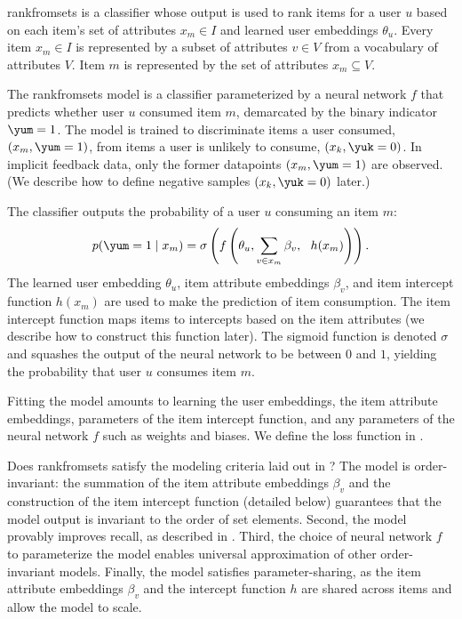 \acrshort{rankfromsets} is a classifier whose output is used to rank items for a
user $u$ based on each item's set of attributes $x_m \in I$ and learned user
embeddings $\theta_u$. Every item $x_m \in I$ is represented by a subset of
attributes $v \in V$ from a vocabulary of attributes $V$. Item $m$ is
represented by the set of attributes $x_m \subseteq V$.

The \acrshort{rankfromsets} model is a classifier parameterized by a neural
network $f$ that predicts whether user $u$ consumed item $m$, demarcated by the
binary indicator $\yum = 1$. The model is trained to discriminate items a user
consumed, $(x_m, \yum=1)$, from items a user is unlikely to consume,
$(x_k, \yuk=0)$. In implicit feedback data, only the former datapoints
$(x_m, \yum = 1)$ are observed. (We describe how to define negative samples
$(x_k, \yuk=0)$ later.)

The classifier outputs the probability of a user $u$ consuming an item $m$:
\begin{align}
p(\yum = 1 \mid x_m) = \sigma\left(f\left(\theta_u, \sum_{v\in x_m}
  \beta_v,~~h(x_m)\right)\right).
\label{eq:rankfromsets}
\end{align}
The learned user embedding $\theta_u$, item attribute embeddings $\beta_v$, and
item intercept function $h(x_m)$ are used to make the prediction of item
consumption. The item intercept function maps items to
intercepts based on the item attributes (we describe how to construct this
function later). The sigmoid function is denoted $\sigma$ and squashes the
output of the neural network to be between $0$ and $1$, yielding the probability
that user $u$ consumes item $m$.

Fitting the model amounts to learning the user embeddings, the item attribute
embeddings, parameters of the item intercept function, and any parameters of the
neural network $f$ such as weights and biases. We define the loss function in
.

Does \acrshort{rankfromsets} satisfy the modeling criteria laid out in
? The model is order-invariant: the summation of the item
attribute embeddings $\beta_v$ and the construction of the item intercept
function (detailed below) guarantees that the model output is invariant to the
order of set elements. Second, the model provably improves recall, as described
in . Third, the choice of neural network $f$ to parameterize
the model enables universal approximation of other order-invariant models.
Finally, the model satisfies parameter-sharing, as the item attribute embeddings
$\beta_v$ and the intercept function $h$ are shared across items and allow the
model to scale.

